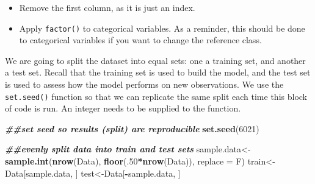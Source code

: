 \documentclass[
]{book}
\newenvironment{Shaded}{\begin{snugshade}}{\end{snugshade}}
\newcommand{\AttributeTok}[1]{\textcolor[rgb]{0.13,0.29,0.53}{#1}}
\newcommand{\DecValTok}[1]{\textcolor[rgb]{0.00,0.00,0.81}{#1}}
\newcommand{\DocumentationTok}[1]{\textcolor[rgb]{0.56,0.35,0.01}{\textbf{\textit{#1}}}}
\newcommand{\FunctionTok}[1]{\textcolor[rgb]{0.13,0.29,0.53}{\textbf{#1}}}
\newcommand{\NormalTok}[1]{#1}
\newcommand{\OtherTok}[1]{\textcolor[rgb]{0.56,0.35,0.01}{#1}}
\newcommand{\SpecialCharTok}[1]{\textcolor[rgb]{0.81,0.36,0.00}{\textbf{#1}}}
\providecommand{\tightlist}{%
  \setlength{\itemsep}{0pt}\setlength{\parskip}{0pt}}
\begin{document}
\begin{itemize}
\tightlist
\item
  Remove the first column, as it is just an index.
\item
  Apply \texttt{factor()} to categorical variables. As a reminder, this should be done to categorical variables if you want to change the reference class.
\end{itemize}

\begin{Shaded}
\end{Shaded}

We are going to split the dataset into equal sets: one a training set, and another a test set. Recall that the training set is used to build the model, and the test set is used to assess how the model performs on new observations. We use the \texttt{set.seed()} function so that we can replicate the same split each time this block of code is run. An integer needs to be supplied to the function.

\begin{Shaded}
\begin{Highlighting}[]
\DocumentationTok{\#\#set seed so results (split) are reproducible}
\FunctionTok{set.seed}\NormalTok{(}\DecValTok{6021}\NormalTok{)}

\DocumentationTok{\#\#evenly split data into train and test sets}
\NormalTok{sample.data}\OtherTok{\textless{}{-}}\FunctionTok{sample.int}\NormalTok{(}\FunctionTok{nrow}\NormalTok{(Data), }\FunctionTok{floor}\NormalTok{(.}\DecValTok{50}\SpecialCharTok{*}\FunctionTok{nrow}\NormalTok{(Data)), }\AttributeTok{replace =}\NormalTok{ F)}
\NormalTok{train}\OtherTok{\textless{}{-}}\NormalTok{Data[sample.data, ]}
\NormalTok{test}\OtherTok{\textless{}{-}}\NormalTok{Data[}\SpecialCharTok{{-}}\NormalTok{sample.data, ]}
\end{Highlighting}
\end{Shaded}
\end{document}

